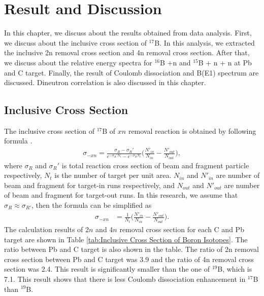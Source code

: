 \chapter{Result and Discussion}
In this chapter, we discuss about the results obtained from data analysis. First, we discuss about the inclusive cross section of ${}^{17}$B. In this analysis, we extracted the inclusive 2n removal cross section and 4n removal cross section. After that, we discuss about the relative energy spectra for ${}^{16}$B +n and ${}^{15}$B + n + n at Pb and C target. Finally, the result of Coulomb dissociation and B(E1) spectrum are discussed. Dineutron correlation is also discussed in this chapter.

\section{Inclusive Cross Section}
The inclusive cross section of ${}^{17}$B of $xn$ removal reaction is obtained by following formula \cite{NKobayashi}.
\begin{align}
    \sigma_{-xn} = \frac{\sigma_R - \sigma_R'}{e^{-\sigma_R' N_t} - e^{-\sigma_R N_t}} \bigg( \frac{N'_{in}}{N_{in}} - \frac{N'_{out}}{N_{out}}\bigg),
\end{align}
where $\sigma_R$ and $\sigma_R'$ is total reaction cross section of beam and fragment particle respectively, $N_t$ is the number of target per unit area. $N_{in}$ and $N'_{in}$ are number of beam and fragment for target-in runs respectively, and $N_{out}$ and $N'_{out}$ are number of beam and fragment for target-out runs. In this research, we assume that $\sigma_R \approx \sigma_{R'}$, then the formula can be simplified as
\begin{align}
    \sigma_{-xn} &= \frac{1}{N_t} \bigg( \frac{N'_{in}}{N_{in}} - \frac{N'_{out}}{N_{out}}\bigg).
\end{align}
The calculation results of 2$n$ and 4$n$ removal cross section for each C and Pb target are shown in Table \ref{tab:Inclusive Cross Section of Boron Isotopes}. The ratio between Pb and C target is also shown in the table. The ratio of 2n removal cross section between Pb and C target was 3.9 and the ratio of 4n removal cross section was 2.4. This result is significantly smaller than the one of ${}^{19}$B, which is 7.1. This result shows that there is less Coulomb dissociation enhancement in ${}^{17}$B than ${}^{19}$B.

